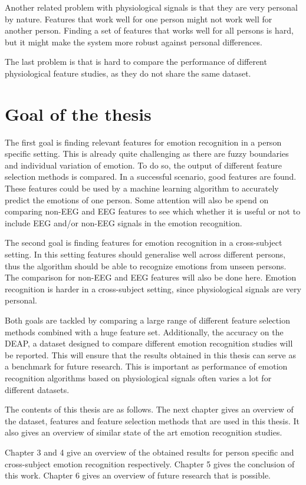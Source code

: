 \npar

Another related problem with physiological signals is that they are very personal by nature. Features that work well for one person might not work well for another person\citep{DEAP}. Finding a set of features that works well for all persons is hard, but it might make the system more robust against personal differences. 

\npar

The last problem is that is hard to compare the performance of different physiological feature studies, as they do not share the same dataset.


\section{Goal of the thesis}
The first goal is finding relevant features for emotion recognition in a person specific setting. This is already quite challenging as there are fuzzy boundaries and individual variation of emotion\citep{emorecoghard}. To do so, the output of different feature selection methods is compared. In a successful scenario, good features are found. These features could be used by a machine learning algorithm to accurately predict the emotions of one person. Some attention will also be spend on comparing non-EEG and EEG features to see which whether it is useful or not to include EEG and/or non-EEG signals in the emotion recognition.

\clearpage

The second goal is finding features for emotion recognition in a cross-subject setting. In this setting features should generalise well across different persons, thus the algorithm should be able to recognize emotions from unseen persons. The comparison for non-EEG and EEG features will also be done here. Emotion recognition is harder in a cross-subject setting, since physiological signals are very personal\citep{DEAP}.

\npar 

Both goals are tackled by comparing a large range of different feature selection methods combined with a huge feature set. Additionally, the accuracy on the DEAP, a dataset designed to compare different emotion recognition studies\citep{DEAP} will be reported. This will ensure that the results obtained in this thesis can serve as a benchmark for future research. This is important as performance of emotion recognition algorithms based on physiological signals often varies a lot for different datasets\citep{PhytoEm}.

\npar 

The contents of this thesis are as follows. The next chapter gives an overview of the dataset, features and feature selection methods that are used in this thesis. It also gives an overview of similar state of the art emotion recognition studies.
 
\npar
Chapter 3 and 4 give an overview of the obtained results for person specific and cross-subject emotion recognition respectively. Chapter 5 gives the conclusion of this work. Chapter 6 gives an overview of future research that is possible.